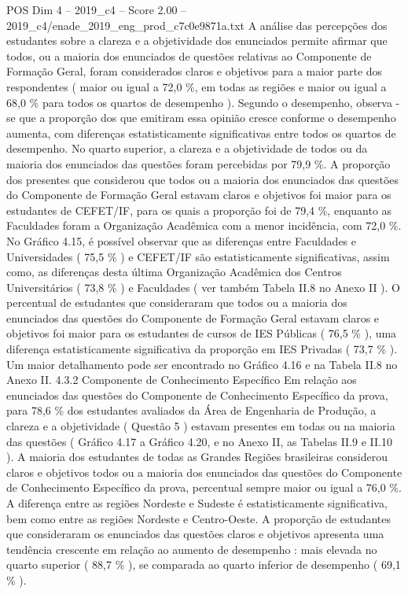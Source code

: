 \begin{textsample}{POS Dim 4 – 2019\_c4 – Score 2.00 – 2019\_c4/enade\_2019\_eng\_prod\_c7c0e9871a.txt}
A análise das percepções dos estudantes sobre a clareza e a objetividade dos enunciados permite afirmar que todos, ou a maioria dos enunciados de questões relativas ao Componente de Formação Geral, foram considerados claros e objetivos para a maior parte dos respondentes ( maior ou igual a 72,0 \%, em todas as regiões e maior ou igual a 68,0 \% para todos os quartos de desempenho ).
Segundo o desempenho, observa -se que a proporção dos que emitiram essa opinião cresce conforme o desempenho aumenta, com diferenças estatisticamente significativas entre todos os quartos de desempenho.
No quarto superior, a clareza e a objetividade de todos ou da maioria dos enunciados das questões foram percebidas por 79,9 \%.
A proporção dos presentes que considerou que todos ou a maioria dos enunciados das questões do Componente de Formação Geral estavam claros e objetivos foi maior para os estudantes de CEFET/IF, para os quais a proporção foi de 79,4 \%, enquanto as Faculdades foram a Organização Acadêmica com a menor incidência, com 72,0 \%.
No Gráfico 4.15, é possível observar que as diferenças entre Faculdades e Universidades ( 75,5 \% ) e CEFET/IF são estatisticamente significativas, assim como, as diferenças desta última Organização Acadêmica dos Centros Universitários ( 73,8 \% ) e Faculdades ( ver também Tabela II.8 no Anexo II ).
O percentual de estudantes que consideraram que todos ou a maioria dos enunciados das questões do Componente de Formação Geral estavam claros e objetivos foi maior para os estudantes de cursos de IES Públicas ( 76,5 \% ), uma diferença estatisticamente significativa da proporção em IES Privadas ( 73,7 \% ).
Um maior detalhamento pode ser encontrado no Gráfico 4.16 e na Tabela II.8 no Anexo II. 4.3.2 Componente de Conhecimento Específico Em relação aos enunciados das questões do Componente de Conhecimento Específico da prova, para 78,6 \% dos estudantes avaliados da Área de Engenharia de Produção, a clareza e a objetividade ( Questão 5 ) estavam presentes em todas ou na maioria das questões ( Gráfico 4.17 a Gráfico 4.20, e no Anexo II, as Tabelas II.9 e II.10 ).
A maioria dos estudantes de todas as Grandes Regiões brasileiras considerou claros e objetivos todos ou a maioria dos enunciados das questões do Componente de Conhecimento Específico da prova, percentual sempre maior ou igual a 76,0 \%.
A diferença entre as regiões Nordeste e Sudeste é estatisticamente significativa, bem como entre as regiões Nordeste e Centro-Oeste.
A proporção de estudantes que consideraram os enunciados das questões claros e objetivos apresenta uma tendência crescente em relação ao aumento de desempenho : mais elevada no quarto superior ( 88,7 \% ), se comparada ao quarto inferior de desempenho ( 69,1 \% ).

\end{textsample}

